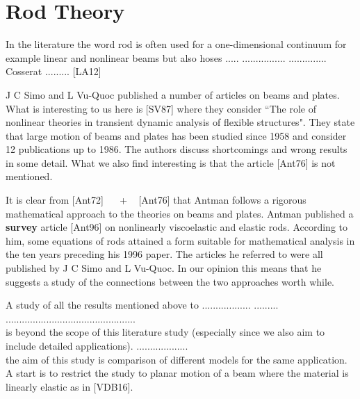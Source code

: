 \documentclass[../../main.tex]{subfiles}
\begin{document}
\section{Rod Theory}
In the literature the word rod is often used for a one-dimensional
continuum for example linear and nonlinear beams but also hoses
..... ................ .............. Cosserat .........
[LA12]

J C Simo and L Vu-Quoc published a number of articles on beams and
plates. What is interesting to us here is [SV87] where they consider
``The role of nonlinear theories in transient dynamic analysis of
flexible structures". They state that large motion of beams and
plates has been studied since 1958 and consider 12 publications up
to 1986. The authors discuss shortcomings and wrong results in some
detail. What we also find interesting is that the article [Ant76] is
not mentioned.

It is clear from [Ant72] ~~ +  ~ [Ant76] that Antman follows a
rigorous mathematical approach to the theories on beams and plates.
Antman published a {\bf survey} article [Ant96] on nonlinearly
viscoelastic and elastic rods. According to him, some equations of
rods attained a form suitable for mathematical analysis in the ten
years preceding his 1996 paper. The articles he referred to were all
published by J C Simo and L Vu-Quoc. In our opinion this means that
he suggests a study of the connections between the two approaches
worth while.

A study of all the results mentioned above to ..................
.........\\ ................................................ \\
is beyond the scope of this literature study (especially since we
also aim to include detailed applications). ...................
\\ the aim of this study is comparison of different models for the
same application. A start is to restrict the study to planar motion
of a beam where the material is linearly elastic as in [VDB16].
\end{document}
